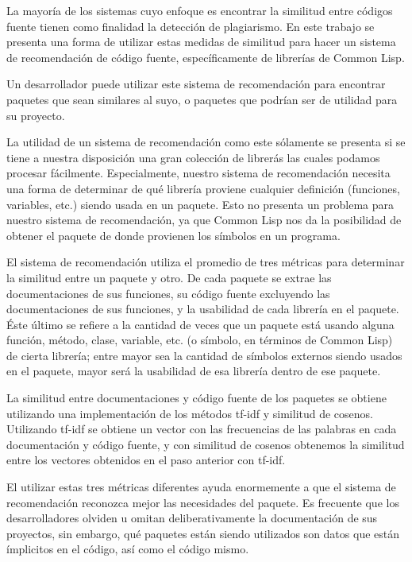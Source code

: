 \documentclass[times, 10pt,twocolumn, a4paper]{article}
\begin{document}

La mayor\'ia de los sistemas cuyo enfoque es encontrar la similitud
entre c\'odigos fuente tienen como finalidad la detecci\'on de
plagiarismo. En este trabajo se presenta una forma de utilizar estas
medidas de similitud para hacer un sistema de recomendaci\'on de
c\'odigo fuente, espec\'ificamente de librer\'ias de Common Lisp.

Un desarrollador puede utilizar este sistema de recomendaci\'on para
encontrar paquetes que sean similares al suyo, o paquetes que
podr\'ian ser de utilidad para su proyecto.

La utilidad de un sistema de recomendaci\'on como este s\'olamente se
presenta si se tiene a nuestra disposici\'on una gran colecci\'on de
librer\'as las cuales podamos procesar f\'acilmente. Especialmente,
nuestro sistema de recomendaci\'on necesita una forma de determinar de
qu\'e librer\'ia proviene cualquier definici\'on (funciones,
variables, etc.) siendo usada en un paquete. Esto no presenta un
problema para nuestro sistema de recomendaci\'on, ya que Common Lisp
nos da la posibilidad de obtener el paquete de donde provienen los
s\'imbolos en un programa.

El sistema de recomendaci\'on utiliza el promedio de tres m\'etricas para
determinar la similitud entre un paquete y otro. De cada paquete se
extrae las documentaciones de sus funciones, su c\'odigo fuente
excluyendo las documentaciones de sus funciones, y la usabilidad de
cada librer\'ia en el paquete. \'Este \'ultimo se refiere a la
cantidad de veces que un paquete est\'a usando alguna funci\'on,
m\'etodo, clase, variable, etc. (o s\'imbolo, en t\'erminos de Common
Lisp) de cierta librer\'ia; entre mayor sea la cantidad de s\'imbolos
externos siendo usados en el paquete, mayor ser\'a la usabilidad de
esa librer\'ia dentro de ese paquete.

La similitud entre documentaciones y c\'odigo fuente de los paquetes
se obtiene utilizando una implementaci\'on de los m\'etodos tf-idf y
similitud de cosenos. Utilizando tf-idf se obtiene un vector con las
frecuencias de las palabras en cada documentaci\'on y c\'odigo fuente, y con
similitud de cosenos obtenemos la similitud entre los vectores
obtenidos en el paso anterior con tf-idf.

El utilizar estas tres m\'etricas diferentes ayuda enormemente a que
el sistema de recomendaci\'on reconozca mejor las necesidades del
paquete. Es frecuente que los desarrolladores olviden u omitan
deliberativamente la documentaci\'on de sus proyectos, sin embargo,
qu\'e paquetes est\'an siendo utilizados son datos que est\'an
\'implicitos en el c\'odigo, as\'i como el c\'odigo mismo.
\end{document}
